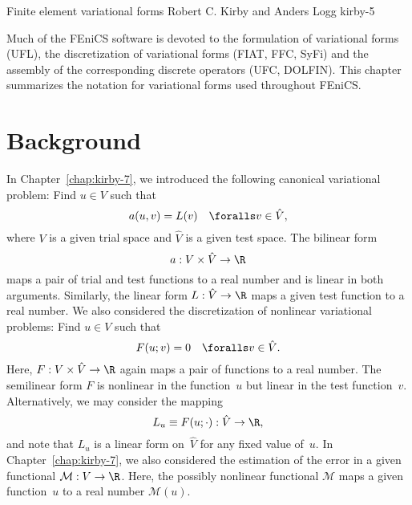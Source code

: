               {Finite element variational forms}
              {Robert C. Kirby and Anders Logg}
              {kirby-5}


Much of the FEniCS software is devoted to the formulation of
variational forms (UFL), the discretization of variational forms
(FIAT, FFC, SyFi) and the assembly of the corresponding discrete
operators (UFC, DOLFIN). This chapter summarizes the notation for
variational forms used throughout FEniCS.

\section{Background}

In Chapter~\ref{chap:kirby-7}, we introduced the following canonical
variational problem: Find $u \in V$ such that
\begin{equation} \label{eq:kirby-5:canonical}
  a(u, v) = L(v) \quad \foralls v \in \hat{V},
\end{equation}
where $V$ is a given trial space and $\hat{V}$ is a given test space.
The bilinear form
\begin{equation}
  a: V \times \hat{V} \rightarrow \R
\end{equation}
maps a pair of trial and test functions to a real number and is linear
in both arguments. Similarly, the linear form $L: \hat{V} \rightarrow
\R$ maps a given test function to a real number. We also considered
the discretization of nonlinear variational problems: Find $u \in V$
such that
\begin{equation}
  F(u; v) = 0 \quad \foralls v \in \hat{V}.
\end{equation}
Here, $F: V \times \hat{V} \rightarrow \R$ again maps a pair of
functions to a real number. The semilinear form $F$ is nonlinear in
the function~$u$ but linear in the test function~$v$. Alternatively,
we may consider the mapping
\begin{equation}
  L_u \equiv F(u; \cdot) : \hat{V} \rightarrow \R,
\end{equation}
and note that $L_u$ is a linear form on~$\hat{V}$ for any fixed value
of~$u$. In Chapter~\ref{chap:kirby-7}, we also considered the
estimation of the error in a given functional $\mathcal{M} : V
\rightarrow \R$. Here, the possibly nonlinear functional $\mathcal{M}$
maps a given function~$u$ to a real number $\mathcal{M}(u)$.

